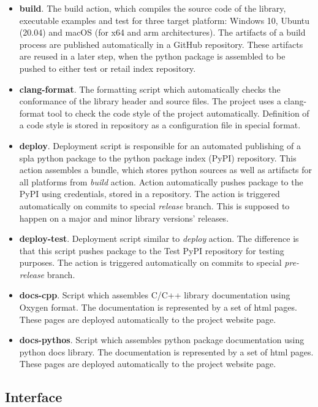 \begin{itemize}
    \item \textbf{build}. The build action, which compiles the source code of the library, executable examples and test for three target platform: Windows 10, Ubuntu (20.04) and macOS (for x64 and arm architectures). The artifacts of a build process are published automatically in a GitHub repository. These artifacts are reused in a later step, when the python package is assembled to be pushed to either test or retail index repository.  
    \item \textbf{clang-format}. The formatting script which automatically checks the conformance of the library header and source files. The project uses a clang-format tool to check the code style of the project automatically. Definition of a code style is stored in repository as a configuration file in special format.  
    \item \textbf{deploy}. Deployment script is responsible for an automated publishing of a spla python package to the python package index (PyPI) repository. This action assembles a bundle, which stores python sources as well as artifacts for all platforms from \textit{build} action. Action automatically pushes package to the PyPI using credentials, stored in a repository. The action is triggered automatically on commits to special \textit{release} branch. This is supposed to happen on a major and minor library versions' releases. 
    \item \textbf{deploy-test}. Deployment script similar to \textit{deploy} action. The difference is that this script pushes package to the Test PyPI repository for testing purposes. The action is triggered automatically on commits to special \textit{pre-release} branch.
    \item \textbf{docs-cpp}. Script which assembles C/C++ library documentation using Oxygen format. The documentation is represented by a set of html pages. These pages are deployed automatically to the project website page. 
    \item \textbf{docs-pythos}. Script which assembles python package documentation using python docs library. The documentation is represented by a set of html pages. These pages are deployed automatically to the project website page. 
\end{itemize}

\subsection{Interface}

